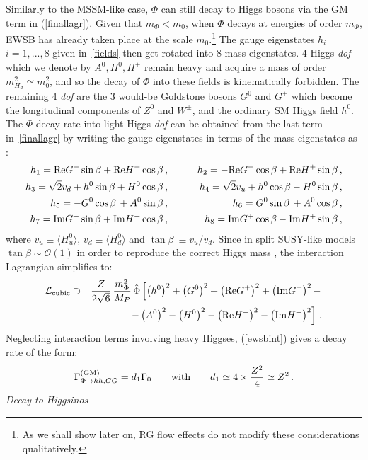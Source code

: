 \documentclass[11pt,a4paper]{article}
\newcommand{\bea}{\begin{eqnarray}}
\newcommand{\eea}{\end{eqnarray}}
\newcommand{\be}{\begin{equation}}
\newcommand{\ee}{\end{equation}}
\def\nn{\nonumber}
\newcommand{\mc}{\mathcal}
\begin{document}
Similarly to the MSSM-like case, $\Phi$ can still decay to Higgs bosons via the GM term in (\ref{finallagr}). Given that $m_\Phi< m_0$, when $\Phi$ decays at energies of order $m_\Phi$, EWSB has already taken place at the scale $m_0$.\footnote{As we shall show later on, RG flow effects do not modify these considerations qualitatively.} The gauge eigenstates $h_i$ $i=1,...,8$ given in~\eqref{fields} then get rotated into $8$ mass eigenstates. $4$ Higgs \textit{dof} which we denote by $A^0, H^0, H^\pm$ remain heavy and acquire a mass of order $m_{H_d}^2 \simeq m_0^2$, and so the decay of $\Phi$ into these fields is kinematically forbidden. The remaining $4$ \textit{dof} are the $3$ would-be Goldstone bosons $G^0$ and $G^{\pm}$ which become the longitudinal components of $Z^0$ and $W^{\pm}$, and the ordinary SM Higgs field $h^0$. The $\Phi$ decay rate into light Higgs \textit{dof} can be obtained from the last term in~\eqref{finallagr} by writing the gauge eigenstates in terms of the mass eigenstates as \cite{Martin:1997ns}:
\bea
h_1 = {\rm Re} G^+ \sin\beta + {\rm Re} H^+ \cos\beta\,,&\qquad& h_2 = - {\rm Re} G^+ \cos\beta + {\rm Re} H^+ \sin\beta\,, \nn \\
h_3 = \sqrt{2} v_d + h^0 \sin\beta + H^0 \cos \beta \,, &\qquad& h_4 = \sqrt{2} v_u + h^0 \cos\beta - H^0 \sin\beta \,, \nn \\
h_5 = - G^0 \cos\beta\, + A^0 \sin \beta\,,&\qquad& h_6 = G^0 \sin\beta\, + A^0 \cos \beta\,, \nn \\
h_7 = {\rm Im} G^+ \sin\beta + {\rm Im} H^+ \cos \beta\,,&\qquad& h_8 = {\rm Im} G^+ \cos\beta - {\rm Im} H^+ \sin\beta\,,
\label{gauge-mass}
\eea
where $v_u \equiv \langle H^0_u \rangle$, $v_d \equiv \langle H^0_d \rangle$ and $\tan \beta~\equiv v_u/v_d$. Since in split SUSY-like models $\tan \beta \sim \mc{O}(1)$ in order to reproduce the correct Higgs mass \cite{Giudice:2011cg, Bagnaschi:2014rsa}, the interaction Lagrangian simplifies to:
\bea
\mc{L}_{\rm cubic} &\supset& \frac{Z}{2\sqrt{6}}\, \frac{m_\Phi^2}{M_P} \, 
\hat\Phi \left[\left(h^0\right)^2+\left(G^0\right)^2+\left({\rm Re}G^+\right)^2+\left({\rm Im} G^+\right)^2 - \right. \nn \\
&&\left.- \left(A^0\right)^2 - \left(H^0\right)^2 - \left({\rm Re}H^+\right)^2 - \left({\rm Im}H^+\right)^2\right]\,.
\label{ewsbint}
\eea
Neglecting interaction terms involving heavy Higgses, (\ref{ewsbint}) gives a decay rate of the form:
\be
\Gamma^{\rm (GM)}_{\Phi \rightarrow hh,GG}=d_1 \Gamma_0\qquad\text{with}\qquad d_1 \simeq 4\times\frac{Z^2}{4}\simeq Z^2\,.
\ee
\newpage
\textit{Decay to Higgsinos}
\end{document}
